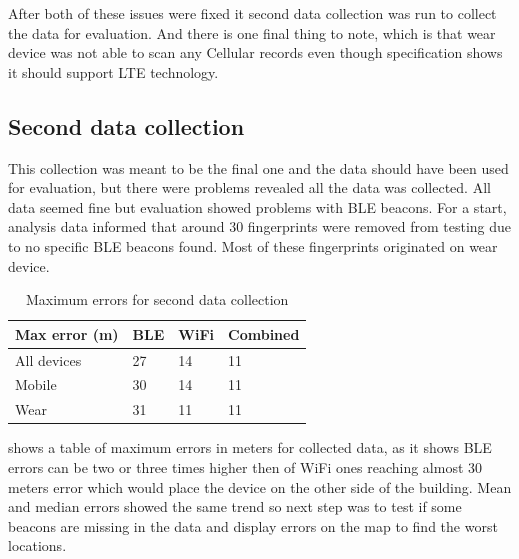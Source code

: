 After both of these issues were fixed it second data collection was run to collect the data for evaluation. And there is one final thing to note, which is that wear device was not able to scan any Cellular records even though specification shows it should support LTE technology. 

\subsection{Second data collection}\label{sec:SecondDataCollection}
This collection was meant to be the final one and the data should have been used for evaluation, but there were problems revealed all the data was collected. All data seemed fine but evaluation showed problems with BLE beacons. For a start, analysis data informed that around 30 fingerprints were removed from testing due to no specific BLE beacons found. Most of these fingerprints originated on wear device.

\begin{table}[h]
	\begin{center}
		\begin{tabular}{ l C{2cm} C{2cm} C{2cm} }
			\hline
			Max error (m) & BLE & WiFi & Combined \\ 
			\hline
			All devices & 27 & 14 & 11 \\ 
			Mobile & 30 & 14 & 11 \\ 
			Wear & 31 & 11 & 11 \\ 
			\hline
		\end{tabular}
		\caption{Maximum errors for second data collection}
		\label{tab01c06}
	\end{center}
\end{table} 

 shows a table of maximum errors in meters for collected data, as it shows BLE errors can be two or three times higher then of WiFi ones reaching almost 30 meters error which would place the device on the other side of the building. Mean and median errors showed the same trend so next step was to test if some beacons are missing in the data and display errors on the map to find the worst locations.


